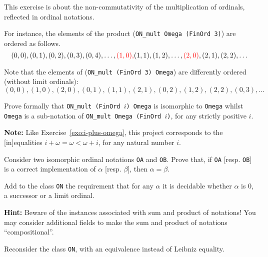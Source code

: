 \label{exo:ON-mult}
\begin{project}

This exercise is about the non-commutativity of the multiplication of ordinals, reflected in ordinal notations.

For instance, the
elements of the product (\texttt{ON\_mult Omega (FinOrd 3)}) are ordered as follows.
\[(0,0),(0,1),(0,2),(0,3),(0,4),\dots,{\color{red}(1,0),} (1,1),(1,2),\dots, {\color{red}(2,0)},(2,1),(2,2),\dots\]

Note that the elements of  (\texttt{ON\_mult (FinOrd 3) Omega}) are differently ordered (without limit ordinals):
\[(0,0),(1,0),(2,0),(0,1),(1,1),(2,1),(0,2),(1,2),(2,2),(0,3),\dots\]


Prove formally  that \texttt{ON\_mult (FinOrd $i$) Omega} is isomorphic to
\texttt{Omega}  whilst
\texttt{Omega}  is a sub-notation of \texttt{ON\_mult Omega (FinOrd $i$)},
for any strictly positive $i$. 

\textbf{Note:} Like Exercise~\ref{exo:i-plus-omega}, this project corresponds to the [in]equalities $i+\omega=\omega<\omega+i$, for any natural number $i$.
\end{project}

\begin{project}
Consider two isomorphic ordinal notations \texttt{OA} and \texttt{OB}.
Prove that, if \texttt{OA} [resp. \texttt{OB}] is a correct implementation 
of $\alpha$ [resp. $\beta$], then $\alpha=\beta$.
\end{project}


\begin{project}
\label{project:succ-limit-dec}
Add to the class \texttt{ON} the requirement that for any $\alpha$ it is decidable whether $\alpha$ is $0$, a successor or a limit ordinal.


\textbf{Hint:}   Beware of the instances associated with sum and product of notations!
  You may consider additional fields 
to make the sum and product of notations ``compositional''.

\end{project}

\begin{project}
\label{project:on-setoid}
Reconsider the  class \texttt{ON}, with an equivalence instead of Leibniz equality.
\end{project}





